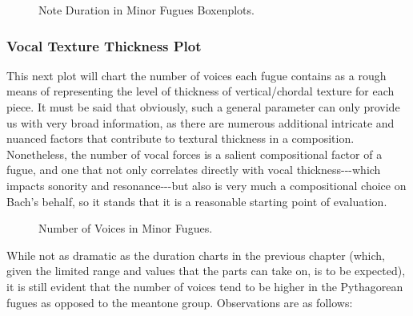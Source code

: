 \begin{figure}[H]
    \begin{center}
    \caption{Note Duration in Minor Fugues Boxenplots.}
    \end{center}
\end{figure}
    
    \subsubsection{Vocal Texture Thickness
Plot}\label{vocal-texture-thickness-plot}

This next plot will chart the number of voices each fugue contains as a
rough means of representing the level of thickness of vertical/chordal
texture for each piece. It must be said that obviously, such a general
parameter can only provide us with very broad information, as there are
numerous additional intricate and nuanced factors that contribute to
textural thickness in a composition. Nonetheless, the number of vocal
forces is a salient compositional factor of a fugue, and one that not
only correlates directly with vocal thickness-\/-\/-which impacts
sonority and resonance-\/-\/-but also is very much a compositional
choice on Bach's behalf, so it stands that it is a reasonable starting
point of evaluation.




\begin{figure}[H]
    \begin{center}
    \caption{Number of Voices in Minor Fugues.}
    \end{center}
\end{figure}
    
    While not as dramatic as the duration charts in the previous chapter
(which, given the limited range and values that the parts can take on,
is to be expected), it is still evident that the number of voices tend
to be higher in the Pythagorean fugues as opposed to the meantone group.
Observations are as follows:

